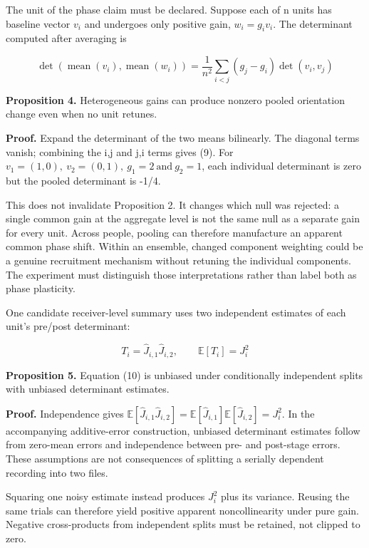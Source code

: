 \documentclass[
  american,
  11pt,
  letterpaper,
]{article}
\begin{document}
The unit of the phase claim must be declared. Suppose each of n units has baseline vector \(v_i\) and undergoes only positive gain, \(w_i=g_i v_i\). The determinant computed after averaging is

\begin{equation}
\det(\operatorname{mean}(v_i),\operatorname{mean}(w_i))=\frac{1}{n^2}\sum_{i<j}(g_j-g_i)\det(v_i,v_j)\tag{9}
\end{equation}

\textbf{Proposition 4.} Heterogeneous gains can produce nonzero pooled orientation change even when no unit retunes.

\textbf{Proof.} Expand the determinant of the two means bilinearly. The diagonal terms vanish; combining the i,j and j,i terms gives (9). For \(v_1=(1,0),\ v_2=(0,1),\ g_1=2\ \text{and}\ g_2=1\), each individual determinant is zero but the pooled determinant is -1/4.

This does not invalidate Proposition 2. It changes which null was rejected: a single common gain at the aggregate level is not the same null as a separate gain for every unit. Across people, pooling can therefore manufacture an apparent common phase shift. Within an ensemble, changed component weighting could be a genuine recruitment mechanism without retuning the individual components. The experiment must distinguish those interpretations rather than label both as phase plasticity.

One candidate receiver-level summary uses two independent estimates of each unit's pre/post determinant:

\begin{equation}
T_i=\widehat J_{i,1}\widehat J_{i,2},\qquad\mathbb E[T_i]=J_i^2\tag{10}
\end{equation}

\textbf{Proposition 5.} Equation (10) is unbiased under conditionally independent splits with unbiased determinant estimates.

\textbf{Proof.} Independence gives \(\mathbb E[\widehat J_{i,1}\widehat J_{i,2}]=\mathbb E[\widehat J_{i,1}]\mathbb E[\widehat J_{i,2}]=J_i^2\). In the accompanying additive-error construction, unbiased determinant estimates follow from zero-mean errors and independence between pre- and post-stage errors. These assumptions are not consequences of splitting a serially dependent recording into two files.

Squaring one noisy estimate instead produces \(J_i^2\) plus its variance. Reusing the same trials can therefore yield positive apparent noncollinearity under pure gain. Negative cross-products from independent splits must be retained, not clipped to zero.
\end{document}

